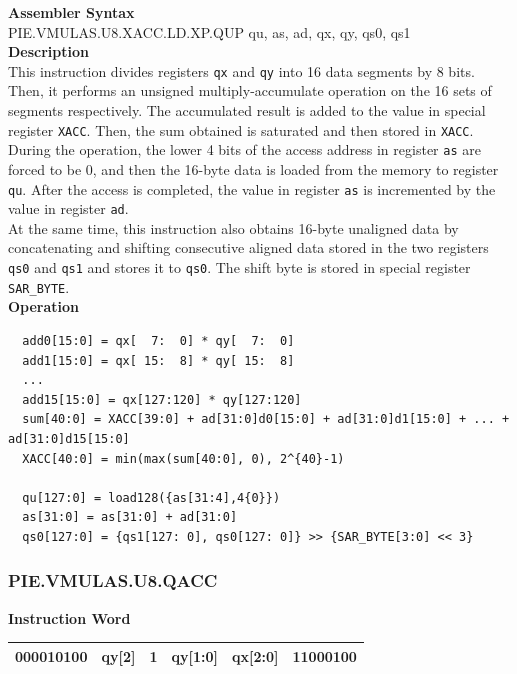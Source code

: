 \textbf{Assembler Syntax} \\
PIE.VMULAS.U8.XACC.LD.XP.QUP qu, as, ad, qx, qy, qs0, qs1 \\
\textbf{Description} \\
This instruction divides registers \lstinline{qx} and \lstinline{qy} into 16 data segments by 8 bits. Then, it performs an unsigned multiply-accumulate operation on the 16 sets of segments respectively. The accumulated result is added to the value in special register \lstinline{XACC}. Then, the sum obtained is saturated and then stored in \lstinline{XACC}.\\
During the operation, the lower 4 bits of the access address in register \lstinline{as} are forced to be 0, and then the 16-byte data is loaded from the memory to register \lstinline{qu}. After the access is completed, the value in register \lstinline{as} is incremented by the value in register \lstinline{ad}.\\
At the same time, this instruction also obtains 16-byte unaligned data by concatenating and shifting consecutive aligned data stored in the two registers \lstinline{qs0} and \lstinline{qs1} and stores it to \lstinline{qs0}. The shift byte is stored in special register \lstinline{SAR_BYTE}.\\
\textbf{Operation}
\begin{lstlisting}
  add0[15:0] = qx[  7:  0] * qy[  7:  0]
  add1[15:0] = qx[ 15:  8] * qy[ 15:  8]
  ...
  add15[15:0] = qx[127:120] * qy[127:120]
  sum[40:0] = XACC[39:0] + ad[31:0]d0[15:0] + ad[31:0]d1[15:0] + ... + ad[31:0]d15[15:0]
  XACC[40:0] = min(max(sum[40:0], 0), 2^{40}-1)

  qu[127:0] = load128({as[31:4],4{0}})
  as[31:0] = as[31:0] + ad[31:0]
  qs0[127:0] = {qs1[127: 0], qs0[127: 0]} >> {SAR_BYTE[3:0] << 3}
\end{lstlisting}

\newpage
\subsubsection{PIE.VMULAS.U8.QACC}\label{instruction:PIEVMULASU8QACC}
\setlength\tabcolsep{6pt}
\textbf{Instruction Word} \\
\begin{tabular}{|c|c|c|c|c|c|}
	\hline
	000010100 & qy[2] & 1 & qy[1:0] & qx[2:0] & 11000100 \\
	\hline
\end{tabular}

